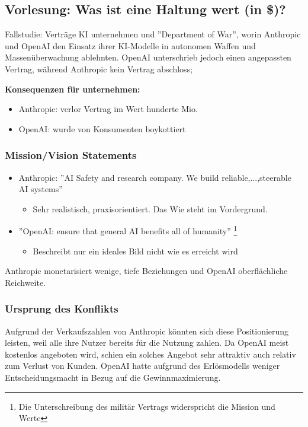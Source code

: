\subsection{Vorlesung: Was ist eine Haltung wert (in \$)?}
Fallstudie: Verträge KI unternehmen und ''Department of War'', worin Anthropic und OpenAI den Einsatz ihrer KI-Modelle in autonomen Waffen und Massenüberwachung ablehnten. OpenAI unterschrieb jedoch einen angepassten Vertrag, während Anthropic kein Vertrag abschloss;

\textbf{Konsequenzen für unternehmen:}
\begin{itemize}
    \item Anthropic: verlor Vertrag im Wert hunderte Mio.
    \item OpenAI: wurde von Konsumenten boykottiert
\end{itemize}

\subsubsection{Mission/Vision Statements}
\begin{itemize}
    \item Anthropic: ''AI Safety and research company. We build reliable,...,steerable AI systems''
    \begin{itemize}
        \item Sehr realistisch, praxisorientiert. Das Wie steht im Vordergrund.
    \end{itemize}
    \item ''OpenAI: ensure that general AI benefits all of humanity'' \footnote{Die Unterschreibung des militär Vertrags widerspricht die Mission und Werte}
    \begin{itemize}
        \item Beschreibt nur ein ideales Bild nicht wie es erreicht wird
    \end{itemize}
\end{itemize}

Anthropic monetarisiert wenige, tiefe Beziehungen und OpenAI oberflächliche Reichweite.


\subsubsection{Ursprung des Konflikts}
Aufgrund der Verkaufszahlen von Anthropic könnten sich diese Positionierung leisten, weil alle ihre Nutzer bereits für die Nutzung zahlen. 
Da OpenAI meist kostenlos angeboten wird, schien ein solches Angebot sehr attraktiv auch relativ zum Verlust von Kunden. OpenAI hatte aufgrund des Erlösmodells weniger Entscheidungsmacht in Bezug auf die Gewinnmaximierung.

